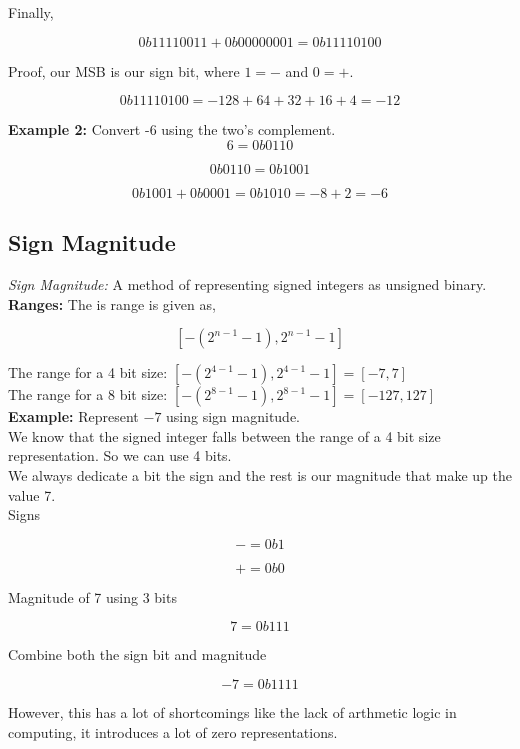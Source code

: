 \documentclass{article}
\begin{document}
Finally,

\[
0b1111 0011 + 0b0000 0001 = 0b1111 0100
\]

Proof, our MSB is our sign bit, where $1 = -$ and $0 = +$.

\[
0b1111 0100 = -128 + 64 + 32 + 16 + 4 = -12
\]

\noindent \textbf{Example 2:} Convert -6 using the two's complement. \\

\[
6 = 0b0110
\]

\[
0b0110 = 0b1001
\]

\[
0b1001 + 0b0001 = 0b1010 = -8 + 2 = -6
\]

\subsection*{Sign Magnitude}
\textit{Sign Magnitude:} A method of representing signed integers as unsigned binary. \\

\noindent \textbf{Ranges:} The is range is given as, 

\[
[-(2^{n-1} - 1), 2^{n-1} - 1]
\]

\noindent The range for a 4 bit size: $[-(2^{4-1} - 1), 2^{4-1} - 1] = [-7, 7]$ \\

\noindent The range for a 8 bit size: $[-(2^{8-1} - 1), 2^{8-1} - 1] = [-127, 127]$ \\

\noindent \textbf{Example:} Represent $-7$ using sign magnitude. \\

We know that the signed integer falls between the range of a 4 bit size representation. So we can use 4 bits. \\
We always dedicate a bit the sign and the rest is our magnitude that make up the value 7. \\

Signs

\[
- = 0b1
\]

\[
+ = 0b0
\]

Magnitude of 7 using 3 bits

\[
7 = 0b111 
\]

Combine both the sign bit and magnitude

\[
-7 = 0b1111
\]

\noindent However, this has a lot of shortcomings like the lack of arthmetic logic in computing, it introduces a lot of
zero representations.
\end{document}
